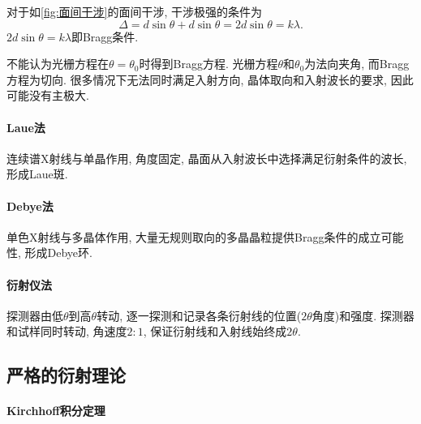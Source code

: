 \documentclass{ctexart}
\begin{document}
对于如\cref{fig:面间干涉}的面间干涉, 干涉极强的条件为
\[ \Delta = d\sin\theta + d\sin\theta = 2d\sin\theta = k\lambda. \]
$2d\sin\theta = k\lambda$即Bragg条件.
\begin{remark}
    不能认为光栅方程在$\theta = \theta_0$时得到Bragg方程. 光栅方程$\theta$和$\theta_0$为法向夹角, 而Bragg方程为切向.  很多情况下无法同时满足入射方向, 晶体取向和入射波长的要求, 因此可能没有主极大.
\end{remark}


\paragraph{Laue法} %
\label{par:laue法}

连续谱X射线与单晶作用, 角度固定, 晶面从入射波长中选择满足衍射条件的波长, 形成Laue斑.


\paragraph{Debye法} %
\label{par:debye法}

单色X射线与多晶体作用, 大量无规则取向的多晶晶粒提供Bragg条件的成立可能性, 形成Debye环.


\paragraph{衍射仪法} %
\label{par:衍射仪法}

探测器由低$\theta$到高$\theta$转动, 逐一探测和记录各条衍射线的位置($2\theta$角度)和强度. 探测器和试样同时转动, 角速度$2:1$, 保证衍射线和入射线始终成$2\theta$.



\subsection{严格的衍射理论} %
\label{sub:严格的衍射理论}

\paragraph{Kirchhoff积分定理} %
\label{par:kirchhoff积分定理}
\end{document}
